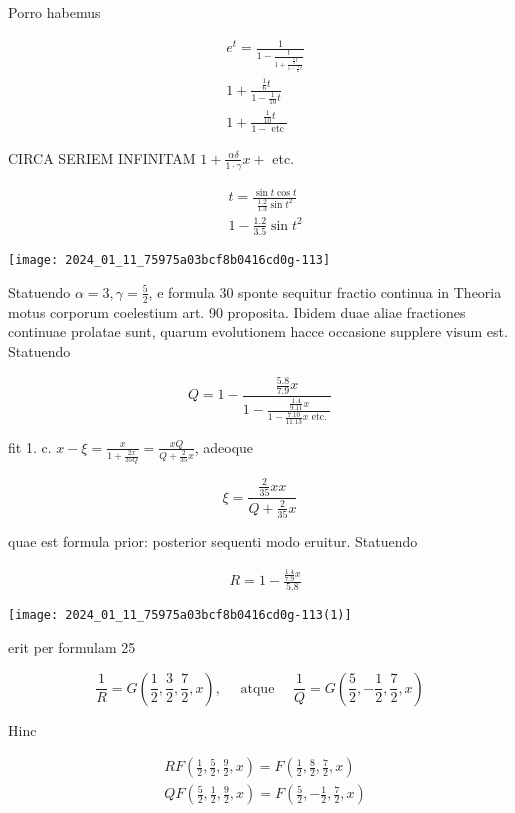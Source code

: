 \documentclass[10pt]{article}
\begin{document}
Porro habemus

\[
\begin{aligned}
& e^{t}=\frac{1}{1-\frac{t}{1+\frac{\frac{1}{3} t}{1-\frac{1}{6} t}}} \\
& 1+\frac{\frac{1}{6} t}{1-\frac{1}{10} t} \\
& 1+\frac{\frac{1}{10} t}{1-\text { etc }}
\end{aligned}
\]

CIRCA SERIEM INFINITAM \(1+\frac{\alpha \delta}{1 \cdot \gamma} x+\) etc.

\[
\begin{aligned}
& t=\frac{\sin t \cos t}{\frac{1.2}{1.3} \sin t^{2}} \\
& 1-\frac{1.2}{3.5} \sin t^{2}
\end{aligned}
\]

\begin{center}
\texttt{[image: 2024\_01\_11\_75975a03bcf8b0416cd0g-113]}
\end{center}

Statuendo \(\alpha=3, \gamma=\frac{5}{2}\), e formula 30 sponte sequitur fractio continua in Theoria motus corporum coelestium art. 90 proposita. Ibidem duae aliae fractiones continuae prolatae sunt, quarum evolutionem hacce occasione supplere visum est. Statuendo

\[
Q=1-\frac{\frac{5.8}{7.9} x}{1-\frac{\frac{1.4}{9.11} x}{1-\frac{7.10}{11.13} x \text { etc. }}}
\]

fit 1. c. \(x-\xi=\frac{x}{1+\frac{2 x}{35 Q}}=\frac{x Q}{Q+\frac{2}{35} x}\), adeoque

\[
\xi=\frac{\frac{2}{35} x x}{Q+\frac{2}{35} x}
\]

quae est formula prior: posterior sequenti modo eruitur. Statuendo

\[
\begin{aligned}
& R=1-\frac{\frac{1.4}{7.9} x}{5.8}
\end{aligned}
\]

\begin{center}
\texttt{[image: 2024\_01\_11\_75975a03bcf8b0416cd0g-113(1)]}
\end{center}

erit per formulam 25

\[
\frac{1}{R}=G\left(\frac{1}{2}, \frac{3}{2}, \frac{7}{2}, x\right), \quad \text { atque } \quad \frac{1}{Q}=G\left(\frac{5}{2},-\frac{1}{2}, \frac{7}{2}, x\right)
\]

Hinc

\[
\begin{aligned}
& R F\left(\frac{1}{2}, \frac{5}{2}, \frac{9}{2}, x\right)=F\left(\frac{1}{2}, \frac{8}{2}, \frac{7}{2}, x\right) \\
& Q F\left(\frac{5}{2}, \frac{1}{2}, \frac{9}{2}, x\right)=F\left(\frac{5}{2},-\frac{1}{2}, \frac{7}{2}, x\right)
\end{aligned}
\]
\end{document}
